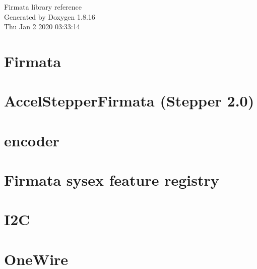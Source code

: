 \let\mypdfximage\pdfximage\def\pdfximage{\immediate\mypdfximage}\documentclass[twoside]{book}
\newcommand{\+}{\discretionary{\mbox{\scriptsize$\hookleftarrow$}}{}{}}
\newcommand{\clearemptydoublepage}{%
  \newpage{\pagestyle{empty}\cleardoublepage}%
}
\begin{document}
\hypersetup{pageanchor=false,
             bookmarksnumbered=true,
             pdfencoding=unicode
            }
\begin{titlepage}
\vspace*{7cm}
\begin{center}%
{\Large Firmata library reference }\\
\vspace*{1cm}
{\large Generated by Doxygen 1.8.16}\\
\vspace*{0.5cm}
{\small Thu Jan 2 2020 03:33:14}\\
\end{center}
\end{titlepage}
\clearemptydoublepage
{}
\tableofcontents
\clearemptydoublepage
{}
\hypersetup{pageanchor=true}

\chapter{Firmata}
\label{index}\hypertarget{index}{}
\chapter{Accel\+Stepper\+Firmata (Stepper 2.0)}
\label{md_protocol_accel_stepper_firmata}

\chapter{encoder}
\label{md_protocol_encoder}

\chapter{Firmata sysex feature registry}
\label{md_protocol_feature-registry}

\chapter{I2C}
\label{md_protocol_i2c}

\chapter{One\+Wire}
\label{md_protocol_onewire}

\end{document}
